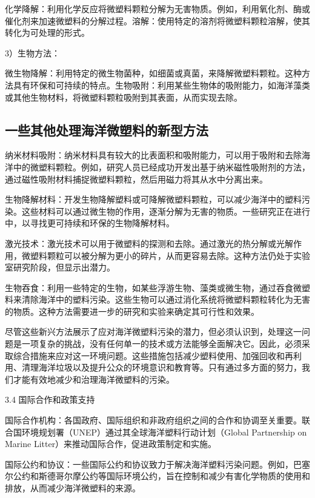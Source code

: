 \documentclass{article}
\begin{document}
    化学降解：利用化学反应将微塑料颗粒分解为无害物质。例如，利用氧化剂、酶或催化剂来加速微塑料的分解过程。溶解：使用特定的溶剂将微塑料颗粒溶解，使其转化为可处理的形式。
    
    3）生物方法：
    
    微生物降解：利用特定的微生物菌种，如细菌或真菌，来降解微塑料颗粒。这种方法具有环保和可持续的特点。生物吸附：利用某些生物体的吸附能力，如海洋藻类或其他生物材料，将微塑料颗粒吸附到其表面，从而实现去除。
    
    \subsection{一些其他处理海洋微塑料的新型方法}
    
    纳米材料吸附：纳米材料具有较大的比表面积和吸附能力，可以用于吸附和去除海洋中的微塑料颗粒。例如，研究人员已经成功开发出基于纳米磁性吸附剂的方法，通过磁性吸附材料捕捉微塑料颗粒，然后用磁力将其从水中分离出来。
    
    生物降解材料：开发生物降解塑料或可降解微塑料颗粒，可以减少海洋中的塑料污染。这些材料可以通过微生物的作用，逐渐分解为无害的物质。一些研究正在进行中，以寻找更可持续和环保的生物降解材料。
    
    激光技术：激光技术可以用于微塑料的探测和去除。通过激光的热分解或光解作用，微塑料颗粒可以被分解为更小的碎片，从而更容易去除。这种方法仍处于实验室研究阶段，但显示出潜力。
    
    生物吞食：利用一些特定的生物，如某些浮游生物、藻类或微生物，通过吞食微塑料来清除海洋中的塑料污染。这些生物可以通过消化系统将微塑料颗粒转化为无害的物质。这种方法需要进一步的研究和实验来确定其可行性和效果。
    
    尽管这些新兴方法展示了应对海洋微塑料污染的潜力，但必须认识到，处理这一问题是一项复杂的挑战，没有任何单一的技术或方法能够全面解决它。因此，必须采取综合措施来应对这一环境问题。这些措施包括减少塑料使用、加强回收和再利用、清理海洋垃圾以及提升公众的环境意识和教育等。只有通过多方面的努力，我们才能有效地减少和治理海洋微塑料的污染。
    
    3.4 国际合作和政策支持
    
    国际合作机构：各国政府、国际组织和非政府组织之间的合作和协调至关重要。联合国环境规划署（UNEP）通过其全球海洋塑料行动计划（Global Partnership on Marine Litter）来推动国际合作，促进政策制定和实施。
    
    国际公约和协议：一些国际公约和协议致力于解决海洋塑料污染问题。例如，巴塞尔公约和斯德哥尔摩公约等国际环境公约，旨在控制和减少有害化学物质的使用和排放，从而减少海洋微塑料的来源。
    
\end{document}
